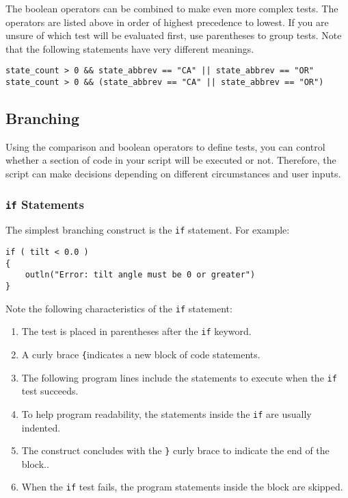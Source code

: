 \documentclass{article}
\begin{document}
The boolean operators can be combined to make even more complex tests.  The operators are listed above in order of highest precedence to lowest.  If you are unsure of which test will be evaluated first, use parentheses to group tests.  Note that the following statements have very different meanings.

\begin{verbatim}
state_count > 0 && state_abbrev == "CA" || state_abbrev == "OR"
state_count > 0 && (state_abbrev == "CA" || state_abbrev == "OR")
\end{verbatim}

\subsection{Branching}
Using the comparison and boolean operators to define tests, you can control whether a section of code in your script will be executed or not.  Therefore, the script can make decisions depending on different circumstances and user inputs.

\subsubsection{\texttt{if} Statements}

The simplest branching construct is the \texttt{if} statement.  For example:

\begin{verbatim}
if ( tilt < 0.0 )
{
    outln("Error: tilt angle must be 0 or greater")
}
\end{verbatim}

Note the following characteristics of the \texttt{if} statement:

\begin{enumerate}
\item The test is placed in parentheses after the \texttt{if} keyword.
\item A curly brace \texttt{\{}indicates a new block of code statements.
\item The following program lines include the statements to execute when the \texttt{if} test succeeds.
\item To help program readability, the statements inside the \texttt{if} are usually indented.
\item The construct concludes with the \texttt{\}} curly brace to indicate the end of the block..
\item When the \texttt{if} test fails, the program statements inside the block are skipped.
\end{enumerate}
\end{document}
